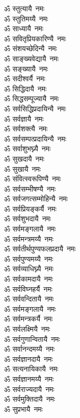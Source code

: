 \begin{flushleft}
\begin{multicols}{2}
ॐ स्तुत्यायै~नमः\\
ॐ स्तुतिमय्यै~नमः\hfill{}\\
ॐ साध्यायै~नमः\\
ॐ सवितृप्रियकारिण्यै~नमः\\
ॐ संशयच्छेदिन्यै~नमः\\
ॐ साङ्ख्यवेद्यायै~नमः\\
ॐ सङ्ख्यायै~नमः\\
ॐ सदीश्वर्यै~नमः\\
ॐ सिद्धिदायै~नमः\\
ॐ सिद्धसम्पूज्यायै~नमः\\
ॐ सर्वसिद्धिप्रदायिन्यै~नमः\\
ॐ सर्वज्ञायै~नमः\hfill{}\\
ॐ सर्वशक्त्यै~नमः\\
ॐ सर्वसम्पत्प्रदायिन्यै~नमः\\
ॐ सर्वाशुभघ्न्यै~नमः\\
ॐ सुखदायै~नमः\\
ॐ सुखायै~नमः\\
ॐ संवित्स्वरूपिण्यै~नमः\\
ॐ सर्वसम्भीषण्यै~नमः\\
ॐ सर्वजगत्सम्मोहिन्यै~नमः\\
ॐ सर्वप्रियङ्कर्यै~नमः\\
ॐ सर्वशुभदायै~नमः\hfill{}\\
ॐ सर्वमङ्गलायै~नमः\\
ॐ सर्वमन्त्रमय्यै~नमः\\
ॐ सर्वतीर्थपुण्यफलप्रदायै~नमः\\
ॐ सर्वपुण्यमय्यै~नमः\\
ॐ सर्वव्याधिघ्न्यै~नमः\\
ॐ सर्वकामदायै~नमः\\
ॐ सर्वविघ्नहर्यै~नमः\\
ॐ सर्ववन्दितायै~नमः\\
ॐ सर्वमङ्गलायै~नमः\\
ॐ सर्वमन्त्रकर्यै~नमः\hfill{}\\
ॐ सर्वलक्ष्मियै~नमः\\
ॐ सर्वगुणान्वितायै~नमः\\
ॐ सर्वानन्दमय्यै~नमः\\
ॐ सर्वज्ञानदायै~नमः\\
ॐ सत्यनायिकायै~नमः\\
ॐ सर्वज्ञानमय्यै~नमः\\
ॐ सर्वराज्यदायै~नमः\\
ॐ सर्वमुक्तिदायै~नमः\\
ॐ सुप्रभायै~नमः\\

\end{multicols}
\end{flushleft}
